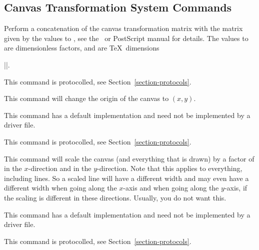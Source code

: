 \subsection{Canvas Transformation System Commands}

\begin{command}{\pgfsys@transformcm{}}
    Perform a concatenation of the canvas transformation matrix with the matrix
    given by the values  to , see the \pdf\ or PostScript
    manual for details. The values  to  are dimensionless
    factors,  and  are \TeX\ dimensions

    \example ||.

    This command is protocolled, see Section~\ref{section-protocols}.
\end{command}

\begin{command}{\pgfsys@transformshift{}}
    This command will change the origin of the canvas to $(x,y)$.

    This command has a default implementation and need not be implemented by a
    driver file.

    This command is protocolled, see Section~\ref{section-protocols}.
\end{command}

\begin{command}{\pgfsys@transformxyscale{}}
    This command will scale the canvas (and  everything that is drawn) by a
    factor of  in the $x$-direction and  in the
    $y$-direction. Note that this applies to everything, including  lines. So a
    scaled line will have a different width and may even have a different width
    when going along the $x$-axis and when going along the $y$-axis, if the
    scaling is different in these directions. Usually, you do not want this.

    This command has a default implementation and need not be implemented by a
    driver file.

    This command is protocolled, see Section~\ref{section-protocols}.
\end{command}

